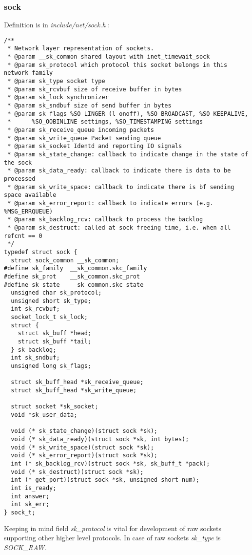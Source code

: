 \documentclass[12pt,a4paper]{article}
\begin{document}
\subsubsection{sock}
Definition is in {\it include/net/sock.h} :
\begin{verbatim}
/**
 * Network layer representation of sockets.
 * @param __sk_common shared layout with inet_timewait_sock
 * @param sk_protocol which protocol this socket belongs in this network family
 * @param sk_type socket type
 * @param sk_rcvbuf size of receive buffer in bytes
 * @param sk_lock synchronizer
 * @param sk_sndbuf size of send buffer in bytes
 * @param sk_flags %SO_LINGER (l_onoff), %SO_BROADCAST, %SO_KEEPALIVE,
 *      %SO_OOBINLINE settings, %SO_TIMESTAMPING settings
 * @param sk_receive_queue incoming packets
 * @param sk_write_queue Packet sending queue
 * @param sk_socket Identd and reporting IO signals
 * @param sk_state_change: callback to indicate change in the state of the sock
 * @param sk_data_ready: callback to indicate there is data to be processed
 * @param sk_write_space: callback to indicate there is bf sending space available
 * @param sk_error_report: callback to indicate errors (e.g. %MSG_ERRQUEUE)
 * @param sk_backlog_rcv: callback to process the backlog
 * @param sk_destruct: called at sock freeing time, i.e. when all refcnt == 0
 */
typedef struct sock {
  struct sock_common __sk_common;
#define sk_family  __sk_common.skc_family
#define sk_prot    __sk_common.skc_prot
#define sk_state   __sk_common.skc_state
  unsigned char sk_protocol;
  unsigned short sk_type;
  int sk_rcvbuf;
  socket_lock_t sk_lock;
  struct {
    struct sk_buff *head;
    struct sk_buff *tail;
  } sk_backlog;
  int sk_sndbuf;
  unsigned long sk_flags;

  struct sk_buff_head *sk_receive_queue;
  struct sk_buff_head *sk_write_queue;

  struct socket *sk_socket;
  void *sk_user_data;

  void (* sk_state_change)(struct sock *sk);
  void (* sk_data_ready)(struct sock *sk, int bytes);
  void (* sk_write_space)(struct sock *sk);
  void (* sk_error_report)(struct sock *sk);
  int (* sk_backlog_rcv)(struct sock *sk, sk_buff_t *pack);
  void (* sk_destruct)(struct sock *sk);
  int (* get_port)(struct sock *sk, unsigned short num);
  int is_ready;
  int answer;
  int sk_err;
} sock_t;

\end{verbatim}

Keeping in mind field {\it sk\_protocol} is vital for development of raw
sockets supporting other higher level protocols. In case of raw sockets
{\it sk\_type} is {\it SOCK\_RAW}.
\end{document}
